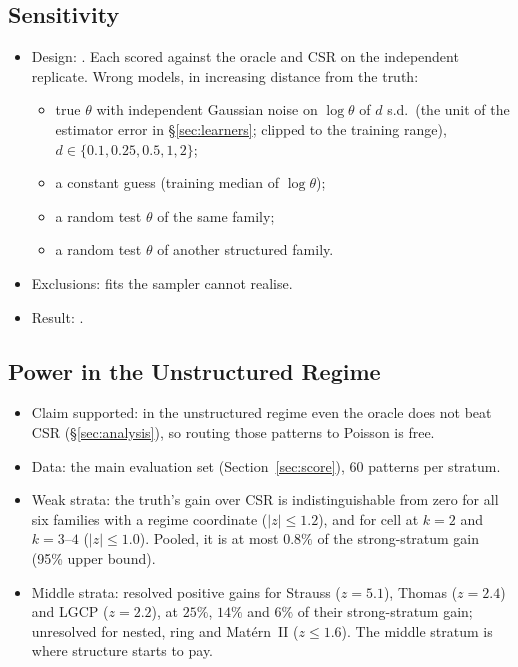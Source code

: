 \subsection{Sensitivity}
\label{app:score-ladder}

\begin{itemize}
  \item Design: . Each scored against the oracle and CSR on the
        independent replicate. Wrong models, in increasing distance from the truth:
  \begin{itemize}
    \item true $\theta$ with independent Gaussian noise on $\log\theta$ of $d$ s.d.\ (the unit of the estimator
          error in \S\ref{sec:learners}; clipped to the training range), $d\in\{0.1,0.25,0.5,1,2\}$;
    \item a constant guess (training median of $\log\theta$);
    \item a random test $\theta$ of the same family;
    \item a random test $\theta$ of another structured family.
  \end{itemize}
  \item Exclusions: fits the sampler cannot realise. 
  \item Result: . 
\end{itemize}

\subsection{Power in the Unstructured Regime}
\label{app:score-power}

\begin{itemize}
  \item Claim supported: in the unstructured regime even the oracle does not beat CSR (\S\ref{sec:analysis}), so routing those
        patterns to Poisson is free.
  \item Data: the main evaluation set (Section~\ref{sec:score}), $60$ patterns per stratum.
  \item Weak strata: the truth's gain over CSR is indistinguishable from zero for all six families with a regime
        coordinate ($|z|\le1.2$), and for cell at $k=2$ and $k=3$--$4$ ($|z|\le1.0$). Pooled, it is at most $0.8\%$ of
        the strong-stratum gain (95\% upper bound).
  \item Middle strata: resolved positive gains for Strauss ($z=5.1$), Thomas ($z=2.4$) and LGCP ($z=2.2$), at
        $25\%$, $14\%$ and $6\%$ of their strong-stratum gain; unresolved for nested, ring and Mat\'ern~II
        ($z\le1.6$). The middle stratum is where structure starts to pay.
\end{itemize}

